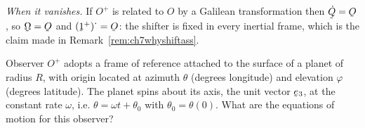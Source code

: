 \begin{solution}
\emph{When it vanishes.} If $O^{+}$ is related to $O$ by a Galilean
transformation then $\dot\bQ=\Ob$, so $\bOm=\Ob$ and
$(\shift^{+})^{\textstyle\cdot}=\Ob$: the shifter is fixed in every
inertial frame, which is the claim made in
Remark~\ref{rem:ch7whyshiftass}.
\end{solution}

\begin{problem}
Observer $O^{+}$ adopts a frame of reference attached to the surface of a
planet of radius $R$, with origin located at azimuth $\theta$ (degrees
longitude) and elevation $\varphi$ (degrees latitude). The planet spins
about its axis, the unit vector $\be_{3}$, at the constant rate $\omega$,
i.e. $\theta=\omega t+\theta_{0}$ with $\theta_{0}=\theta(0)$. What are
the equations of motion for this observer?
\end{problem}


